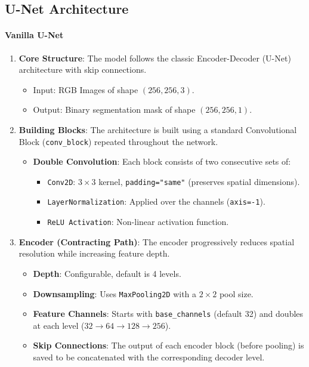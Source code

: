 \subsection{U-Net Architecture}

\paragraph{Vanilla U-Net}

\begin{enumerate}
    \item \textbf{Core Structure}: The model follows the classic Encoder-Decoder (U-Net) architecture with skip connections.
    \begin{itemize}
        \item Input: RGB Images of shape $(256, 256, 3)$.
        \item Output: Binary segmentation mask of shape $(256, 256, 1)$.
    \end{itemize}

    \item \textbf{Building Blocks}: The architecture is built using a standard Convolutional Block (\texttt{conv\_block}) repeated throughout the network.
    \begin{itemize}
        \item \textbf{Double Convolution}: Each block consists of two consecutive sets of:
        \begin{itemize}
            \item \texttt{Conv2D}: $3 \times 3$ kernel, \texttt{padding="same"} (preserves spatial dimensions).
            \item \texttt{LayerNormalization}: Applied over the channels (\texttt{axis=-1}).
            \item \texttt{ReLU Activation}: Non-linear activation function.
        \end{itemize}
    \end{itemize}

    \item \textbf{Encoder (Contracting Path)}: The encoder progressively reduces spatial resolution while increasing feature depth.
    \begin{itemize}
        \item \textbf{Depth}: Configurable, default is 4 levels.
        \item \textbf{Downsampling}: Uses \texttt{MaxPooling2D} with a $2 \times 2$ pool size.
        \item \textbf{Feature Channels}: Starts with \texttt{base\_channels} (default 32) and doubles at each level ($32 \rightarrow 64 \rightarrow 128 \rightarrow 256$).
        \item \textbf{Skip Connections}: The output of each encoder block (before pooling) is saved to be concatenated with the corresponding decoder level.
    \end{itemize}


\end{enumerate}
